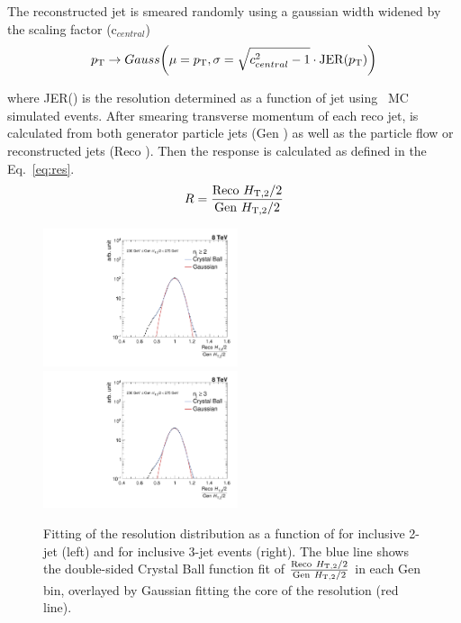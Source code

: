 The reconstructed jet \pt is smeared randomly using a gaussian width widened by the scaling factor (c$_{central}$) 
\begin{equation}
p_{\mathrm{T}} \rightarrow Gauss\bigg(\mu = p_{\mathrm{T}}, \sigma = \sqrt{c^2_{central} - 1} \cdot {\rm JER}(p_{\mathrm{T}})\bigg)
\end{equation}

where JER(\pt) is the resolution determined as a function of jet \pt using \MGP~MC simulated events. After smearing transverse momentum of each reco jet, \httwo is calculated from both generator particle jets (Gen \httwons) as well as the particle flow or reconstructed jets (Reco \httwons). Then the response is calculated as defined in the Eq.~\ref{eq:res}. 
\begin{equation}
\label{eq:res}
  R = \frac{{\rm Reco}~\httwo}{{\rm Gen}~\httwo}
\end{equation}

\begin{figure}[h]
  \begin{center}
    \includegraphics[width=0.51\textwidth]{Plots_HT_2_150/Fit_Res_2_final_crystal_genbin_250-275_crystal_nomet.pdf}%
    ~~\includegraphics[width=0.51\textwidth]{Plots_HT_2_150/Fit_Res_3_final_crystal_genbin_250-275_crystal_nomet.pdf}
    \caption{Fitting of the resolution distribution as a function of \httwo for inclusive 2-jet (left) and for inclusive 3-jet events (right). The blue line shows the double-sided Crystal Ball function fit of $\frac{{\rm Reco}~\httwo}{{\rm Gen}~\httwo}$ in each Gen \httwo bin, overlayed by Gaussian fitting the core of the resolution (red line).}
    \label{fig:fit_gauss}
  \end{center}
\end{figure}

